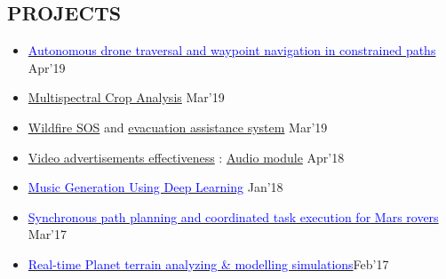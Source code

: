 \documentclass[11pt]{res} %
\newcommand{\sectgap}{0.05in} %
\begin{document}
\begin{resume}

\section{PROJECTS}
\vspace{0.25in}
\begin{itemize}
    \item
    \href{https://github.com/chetanchawla/eYantra2018-HB}{\textcolor{blue}{Autonomous drone traversal and waypoint navigation in constrained paths}} \hfill Apr'19
    \item \textcolor{blue}{\href{https://github.com/chetanchawla/Dronalyser}{Multispectral Crop Analysis}} \hfill Mar'19
    \item
    \textcolor{blue}{\href{https://github.com/Future-Gadgets-Lab/FOS-Fire-SOS-System}{Wildfire SOS}} and \textcolor{blue}{\href{https://github.com/chetanchawla/Future-Gadget-Labs-HINT}{evacuation assistance system}} \hfill Mar'19
    
    \item
    \textcolor{blue}{\href{http://people.cs.pitt.edu/~kovashka/ads/}{Video advertisements effectiveness}} : \textcolor{blue}{\href{https://github.com/chetanchawla/Audio-Analysis}{Audio module}} \hfill Apr'18
    
    \item
    \href{https://github.com/chetanchawla/Deep-Learning-for-Music-Generation}{\textcolor{blue}{Music Generation Using Deep Learning}} \hfill Jan'18
    \item
    \href{https://github.com/chetanchawla/eYantra-2016-Bothoven}{\textcolor{blue}{Synchronous path planning and coordinated task execution for Mars rovers}} \hfill Mar'17
    \item
    \href{https://github.com/chetanchawla/Blender-Models}{\textcolor{blue}{Real-time Planet terrain analyzing \& modelling simulations}}\hfill Feb'17
\end{itemize}
\vspace{\sectgap} 
\hline


\end{resume}
\end{document}
